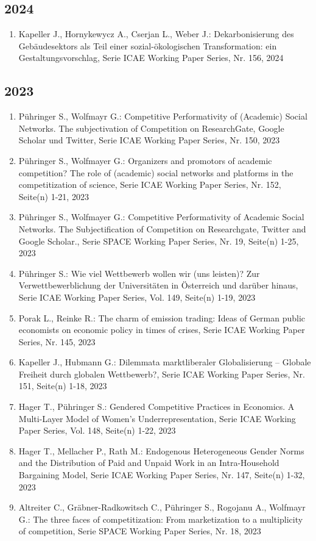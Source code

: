 \subsection*{2024}
\begin{enumerate}
    	 \item Kapeller J., Hornykewycz A., Cserjan L., Weber J.: Dekarbonisierung des Gebäudesektors als Teil einer sozial-ökologischen Transformation: ein Gestaltungsvorschlag, Serie ICAE Working Paper Series, Nr. 156, 2024
\end{enumerate}
\subsection*{2023}
\begin{enumerate}
    	 \item Pühringer S., Wolfmayr G.: Competitive Performativity of (Academic) Social Networks. The subjectivation of Competition on ResearchGate, Google Scholar und Twitter, Serie ICAE Working Paper Series, Nr. 150, 2023
	 \item Pühringer S., Wolfmayer G.: Organizers and promotors of academic competition? The role of (academic) social networks and platforms in the competitization of science, Serie ICAE Working Paper Series, Nr. 152, Seite(n) 1-21, 2023
	 \item Pühringer S., Wolfmayer G.: Competitive Performativity of Academic Social Networks. The Subjectification of Competition on Researchgate, Twitter and Google Scholar., Serie SPACE Working Paper Series, Nr. 19, Seite(n) 1-25, 2023
	 \item Pühringer S.: Wie viel Wettbewerb wollen wir (uns leisten)? Zur Verwettbewerblichung der Universitäten in Österreich und darüber hinaus, Serie ICAE Working Paper Series, Vol. 149, Seite(n) 1-19, 2023
	 \item Porak L., Reinke R.: The charm of emission trading: Ideas of German public economists on economic policy in times of crises, Serie ICAE Working Paper Series, Nr. 145, 2023
	 \item Kapeller J., Hubmann G.: Dilemmata marktliberaler Globalisierung – Globale Freiheit durch globalen Wettbewerb?, Serie ICAE Working Paper Series, Nr. 151, Seite(n) 1-18, 2023
	 \item Hager T., Pühringer S.: Gendered Competitive Practices in Economics. A Multi-Layer Model of Women’s Underrepresentation, Serie ICAE Working Paper Series, Vol. 148, Seite(n) 1-22, 2023
	 \item Hager T., Mellacher P., Rath M.: Endogenous Heterogeneous Gender Norms and the Distribution of Paid and Unpaid Work in an Intra-Household Bargaining Model, Serie ICAE Working Paper Series, Nr. 147, Seite(n) 1-32, 2023
	 \item Altreiter C., Gräbner-Radkowitsch C., Pühringer S., Rogojanu A., Wolfmayr G.: The three faces of competitization: From marketization to a multiplicity of competition, Serie SPACE Working Paper Series, Nr. 18, 2023
\end{enumerate}

